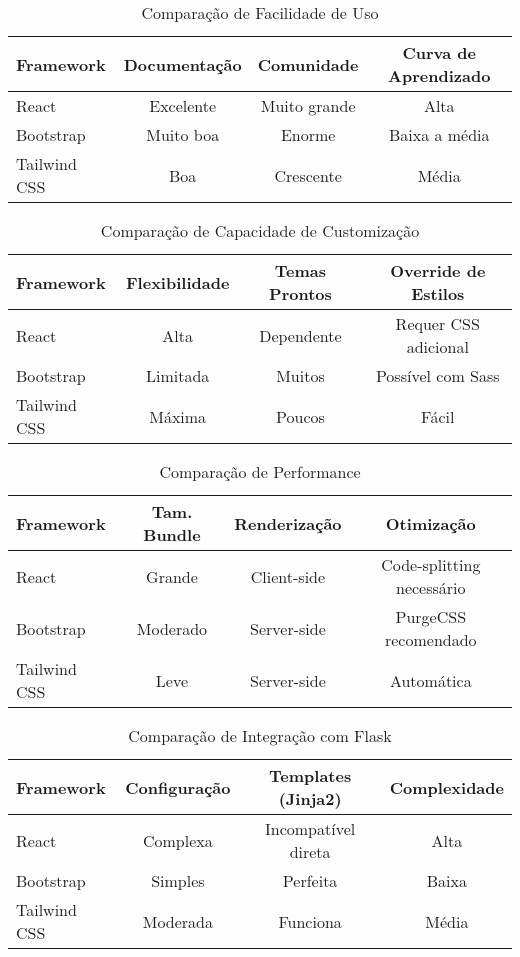\documentclass[11pt]{article}
\begin{document}
\begin{table}[H]
\centering
\caption{Comparação de Facilidade de Uso}
\begin{tabular}{lccc}
\toprule
\textbf{Framework} & \textbf{Documentação} & \textbf{Comunidade} & \textbf{Curva de Aprendizado} \\
\midrule
React & Excelente & Muito grande & Alta \\
Bootstrap & Muito boa & Enorme & Baixa a média \\
Tailwind CSS & Boa & Crescente & Média \\
\bottomrule
\end{tabular}
\end{table}

\begin{table}[H]
\centering
\caption{Comparação de Capacidade de Customização}
\begin{tabular}{lccc}
\toprule
\textbf{Framework} & \textbf{Flexibilidade} & \textbf{Temas Prontos} & \textbf{Override de Estilos} \\
\midrule
React & Alta & Dependente & Requer CSS adicional \\
Bootstrap & Limitada & Muitos & Possível com Sass \\
Tailwind CSS & Máxima & Poucos & Fácil \\
\bottomrule
\end{tabular}
\end{table}

\begin{table}[H]
\centering
\caption{Comparação de Performance}
\begin{tabular}{lccc}
\toprule
\textbf{Framework} & \textbf{Tam. Bundle} & \textbf{Renderização} & \textbf{Otimização} \\
\midrule
React & Grande & Client-side & Code-splitting necessário \\
Bootstrap & Moderado & Server-side & PurgeCSS recomendado \\
Tailwind CSS & Leve & Server-side & Automática \\
\bottomrule
\end{tabular}
\end{table}

\begin{table}[H]
\centering
\caption{Comparação de Integração com Flask}
\begin{tabular}{lccc}
\toprule
\textbf{Framework} & \textbf{Configuração} & \textbf{Templates (Jinja2)} & \textbf{Complexidade} \\
\midrule
React & Complexa & Incompatível direta & Alta \\
Bootstrap & Simples & Perfeita & Baixa \\
Tailwind CSS & Moderada & Funciona & Média \\
\bottomrule
\end{tabular}
\end{table}
\end{document}
